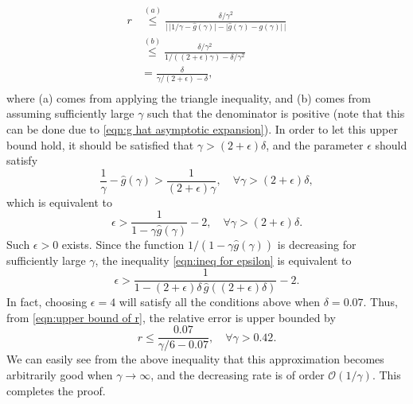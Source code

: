 \documentclass[journal,twocolumn]{IEEEtran}
\theoremstyle{nonumberplain}
\begin{document}
    \begin{equation}
        \begin{aligned}
        r & \overset{(a)}{\leq} \frac{\delta/\gamma^2}{\lvert \,\lvert 1/\gamma - \hat{g}(\gamma)\rvert - \lvert \hat{g}(\gamma) -  g(\gamma)\rvert\,\rvert} \\
        & \overset{(b)}{\leq} \frac{\delta/\gamma^2}{1/((2+\epsilon)\gamma) - \delta/\gamma^2} \\
        & = \frac{\delta}{\gamma/(2+\epsilon) - \delta}, \\
        \end{aligned}
        \label{eqn:upper bound of r}
    \end{equation}
    where (a) comes from applying the triangle inequality, and (b) comes from assuming sufficiently large $\gamma$ such that the denominator is positive (note that this can be done due to \eqref{eqn:g hat asymptotic expansion}).
    In order to let this upper bound hold, it should be satisfied that $\gamma > (2+\epsilon)\delta$, and the parameter $\epsilon$ should satisfy 
    \begin{equation}
        \frac{1}{\gamma} - \hat{g}(\gamma) > \frac{1}{(2+\epsilon)\gamma}, \quad\forall \gamma > (2+\epsilon)\delta,
    \end{equation}
    which is equivalent to 
    \begin{equation}
        \epsilon > \frac{1}{1-\gamma \hat{g}(\gamma)}-2,\quad \forall \gamma > (2+\epsilon)\delta.
        \label{eqn:ineq for epsilon}
    \end{equation}
    Such $\epsilon>0$ exists. Since the function $ 1/(1-\gamma \hat{g}(\gamma))$ is decreasing for sufficiently large $\gamma$, the inequality \eqref{eqn:ineq for epsilon} is equivalent to 
    \begin{equation}
        \epsilon > \frac{1}{1-(2+\epsilon)\delta\, \hat{g}((2+\epsilon)\delta)}-2.
    \end{equation}
    In fact, choosing $\epsilon=4$ will satisfy all the conditions above when $\delta = 0.07$. Thus, from \eqref{eqn:upper bound of r}, the relative error is upper bounded by 
    \begin{equation}
        r \leq \frac{0.07}{\gamma/6 - 0.07},\quad \forall \gamma > 0.42.
    \end{equation}
    We can easily see from the above inequality that this approximation becomes arbitrarily good when $\gamma\to\infty$, and the decreasing rate is of order $\mathcal{O}(1/\gamma)$. This completes the proof. 

\footnotesize
\balance 


\end{document}
